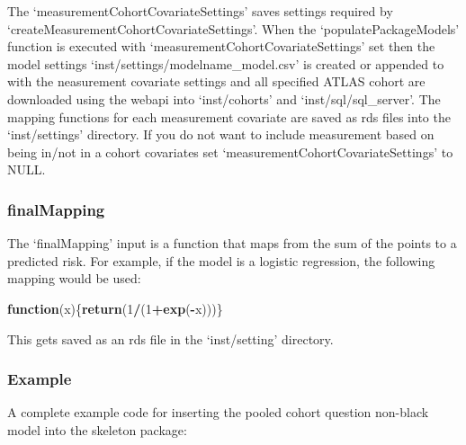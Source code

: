 \documentclass[
]{article}
\newenvironment{Shaded}{\begin{snugshade}}{\end{snugshade}}
\newcommand{\ControlFlowTok}[1]{\textcolor[rgb]{0.13,0.29,0.53}{\textbf{#1}}}
\newcommand{\DecValTok}[1]{\textcolor[rgb]{0.00,0.00,0.81}{#1}}
\newcommand{\KeywordTok}[1]{\textcolor[rgb]{0.13,0.29,0.53}{\textbf{#1}}}
\newcommand{\NormalTok}[1]{#1}
\newcommand{\OperatorTok}[1]{\textcolor[rgb]{0.81,0.36,0.00}{\textbf{#1}}}
\begin{document}
The `measurementCohortCovariateSettings' saves settings required by
`createMeasurementCohortCovariateSettings'. When the
`populatePackageModels' function is executed with
`measurementCohortCovariateSettings' set then the model settings
`inst/settings/modelname\_model.csv' is created or appended to with the
neasurement covariate settings and all specified ATLAS cohort are
downloaded using the webapi into `inst/cohorts' and
`inst/sql/sql\_server'. The mapping functions for each measurement
covariate are saved as rds files into the `inst/settings' directory. If
you do not want to include measurement based on being in/not in a cohort
covariates set `measurementCohortCovariateSettings' to NULL.

\hypertarget{finalmapping}{%
\subsubsection{finalMapping}\label{finalmapping}}

The `finalMapping' input is a function that maps from the sum of the
points to a predicted risk. For example, if the model is a logistic
regression, the following mapping would be used:

\begin{Shaded}
\begin{Highlighting}[]
\ControlFlowTok{function}\NormalTok{(x)\{}\KeywordTok{return}\NormalTok{(}\DecValTok{1}\OperatorTok{/}\NormalTok{(}\DecValTok{1}\OperatorTok{+}\KeywordTok{exp}\NormalTok{(}\OperatorTok{-}\NormalTok{x)))\}}
\end{Highlighting}
\end{Shaded}

This gets saved as an rds file in the `inst/setting' directory.

\hypertarget{example}{%
\subsubsection{Example}\label{example}}

A complete example code for inserting the pooled cohort question
non-black model into the skeleton package:
\end{document}
